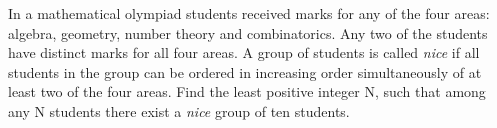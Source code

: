 In a mathematical olympiad students received marks for any of the four areas: algebra, geometry, number theory and combinatorics. Any two of the students have distinct marks for all four areas. A group of students is called \textit{nice } if all students in the group can be ordered in increasing order simultaneously of at least two of the four areas. Find the least positive integer N, such that among any N students there exist a \textit{nice } group of ten students.